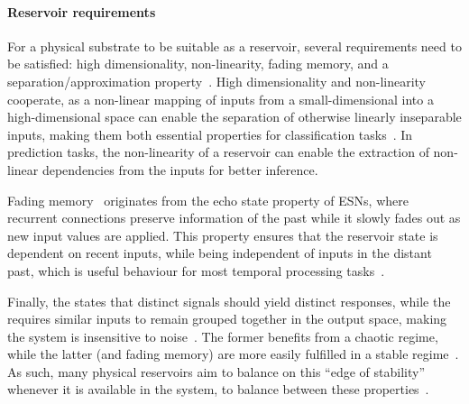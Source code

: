 \paragraph{Reservoir requirements}
For a physical substrate to be suitable as a reservoir, several requirements need to be satisfied: high dimensionality, non-linearity, fading memory, and a separation/approximation property~\cite{appeltant2011information}.
High dimensionality and non-linearity cooperate, as a non-linear mapping of inputs from a small-dimensional into a high-dimensional space can enable the separation of otherwise linearly inseparable inputs, making them both essential properties for classification tasks~\cite{VoltageControlled_SuperparamagneticRC,RC_ASI,appeltant2011information,RC_RecentAdvances}. %
In prediction tasks, the non-linearity of a reservoir can enable the extraction of non-linear dependencies from the inputs for better inference. \par
Fading memory~\cite{boyd1985ApproximatingVolterra} originates from the echo state property of ESNs, where recurrent connections preserve information of the past while it slowly fades out as new input values are applied.
This property ensures that the reservoir state is dependent on recent inputs, while being independent of inputs in the distant past, which is useful behaviour for most temporal processing tasks~\cite{ChaoticTimeSeries_ML,appeltant2011information}. \par %
Finally, the  states that distinct signals should yield distinct responses, while the  requires similar inputs to remain grouped together in the output space, making the system is insensitive to noise~\cite{RCbenchmarksReview1}.
The former benefits from a chaotic regime, while the latter (and fading memory) are more easily fulfilled in a stable regime~\cite{RC_RecentAdvances}.
As such, many physical reservoirs aim to balance on this ``edge of stability'' whenever it is available in the system, to balance between these properties~\cite{appeltant2011information}.

